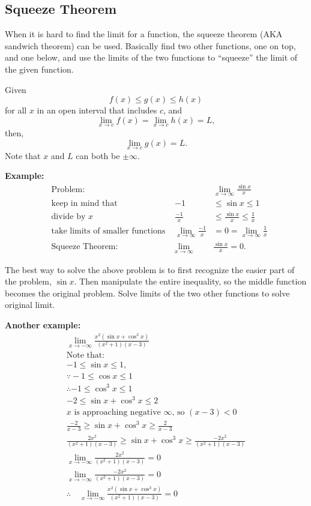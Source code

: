 \documentclass[12pt]{article}
\begin{document}
\subsection{Squeeze Theorem}
When it is hard to find the limit for a function, the squeeze theorem (AKA sandwich theorem) can be used. Basically find two other functions, one on top, and one below, and use the limits of the two functions to ``squeeze'' the limit of the given function.

\noindent Given
\[ f(x) \le g(x) \le h(x) \]
for all $x$ in an open interval that includes $c$, and
\[ \lim_{x \to c} f(x) = \lim_{x \to c} h(x) = L, \]
then,
\[ \lim_{x \to c} g(x) = L. \]
Note that $x$ and $L$ can both be $\pm \infty$.

\noindent \textbf{Example:}
\begin{align*}
     & \text{Problem:}                          &                                  & \lim_{x \to \infty} \frac{\sin{x}}{x} \\[6pt]
     & \text{keep in mind that}                 & -1                               & \le \sin{x} \le 1                     \\
     & \text{divide by $x$}                     & \frac{-1}{x}                     & \le \frac{\sin{x}}{x} \le \frac{1}{x} \\[6pt]
     & \text{take limits of smaller functions } & \lim_{x \to \infty} \frac{-1}{x} & = 0 = \lim_{x \to \infty} \frac{1}{x} \\[6pt]
     & \text{Squeeze Theorem:}                  & \lim_{x \to \infty}              & \frac{\sin{x}}{x} = 0.
\end{align*}

The best way to solve the above problem is to first recognize the easier part of the problem, $\sin{x}$. Then manipulate the entire inequality, so the middle function becomes the original problem. Solve limits of the two other functions to solve original limit.

\noindent \textbf{Another example:}
\begin{gather*}
    \lim_{x \to -\infty} \frac{x^2(\sin{x} + \cos^{3}{x})}{(x^2+1)(x-3)} \\[8pt]
    \text{Note that:} \\
    -1 \le \sin{x} \le 1, \\
    \because -1 \le \cos{x} \le {1} \\
    \therefore -1 \le \cos^{3}{x} \le 1 \\
    -2 \le \sin{x} + \cos^{3}{x} \le 2 \\[8pt]
    \text{$x$ is approaching negative $\infty$, so $(x-3) < 0$} \\
    \frac{-2}{x-3} \ge \sin{x} + \cos^{3}{x} \ge \frac{2}{x-3} \\[6pt]
    \frac{2x^2}{(x^2+1)(x-3)} \ge \sin{x} + \cos^{3}{x} \ge \frac{-2x^2}{(x^2+1)(x-3)} \\[10pt]
    \lim_{x \to -\infty}\frac{2x^2}{(x^2+1)(x-3)} = 0 \\[6pt]
    \lim_{x \to -\infty}\frac{-2x^2}{(x^2+1)(x-3)} = 0 \\[6pt]
    \therefore \quad \lim_{x \to -\infty} \frac{x^2(\sin{x} + \cos^{3}{x})}{(x^2+1)(x-3)} = 0
\end{gather*}
\end{document}
